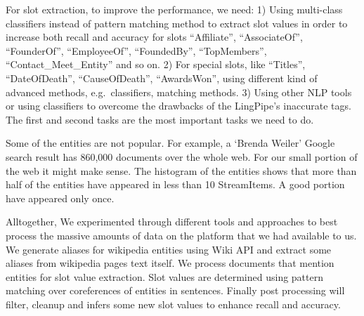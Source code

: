 For slot extraction, to improve the performance, we need: 1) Using multi-class classifiers instead of pattern matching method to extract slot values in order to increase both recall and accuracy for slots ``Affiliate'', ``AssociateOf'', ``FounderOf'', ``EmployeeOf'', ``FoundedBy'', ``TopMembers'', ``Contact\_Meet\_Entity'' and so on. 2) For special slots, like ``Titles'', ``DateOfDeath'', ``CauseOfDeath'', ``AwardsWon'', using different kind of advanced methods, e.g.\ classifiers, matching methods. 3) Using other NLP tools or using classifiers to overcome the drawbacks of the LingPipe’s inaccurate tags. The first and second tasks are the most important tasks we need to do.

Some of the entities are not popular. For example, a `Brenda Weiler' Google search result has 860,000 documents over the whole web. For our small portion of the web it might make sense. The histogram of the entities shows that more than half of the entities have appeared in less than 10 StreamItems. A good portion have appeared only once.






Alltogether, We experimented through different tools and approaches to best process the massive amounts of data on the platform that we had available to us. We generate aliases for wikipedia entities using Wiki API and extract some aliases from wikipedia pages text itself. We process documents that mention entities for slot value extraction. Slot values are determined using pattern matching over coreferences of entities in sentences. Finally post processing will filter, cleanup and infers some new slot values to enhance recall and accuracy. 

